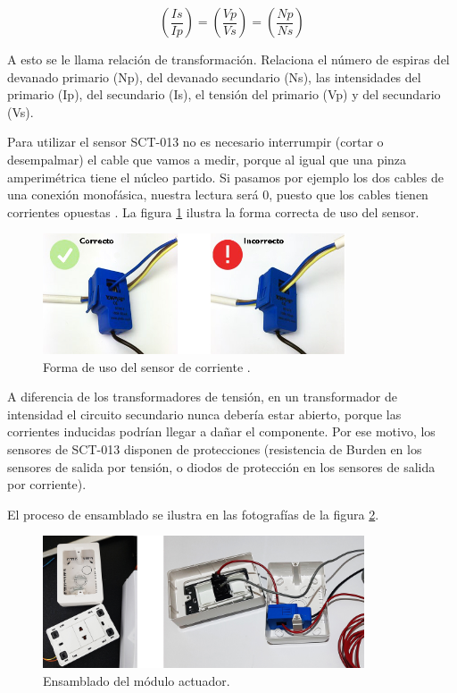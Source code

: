 \begin{enumerate}
\begin{equation}
	\label{eq:proporcionform}
	\left( \frac{Is}{Ip} \right)=\left( \frac{Vp}{Vs} \right)=\left( \frac{Np}{Ns} \right)
\end{equation}

A esto se le llama relación de transformación. Relaciona el número de espiras del devanado primario (Np), del devanado secundario (Ns), las intensidades del primario (Ip), del secundario (Is), el tensión del primario (Vp) y del secundario (Vs). 


Para utilizar el sensor SCT-013 no es necesario interrumpir (cortar o desempalmar) el cable que vamos a medir, porque al igual que una pinza amperimétrica tiene el núcleo partido. Si pasamos por ejemplo los dos cables de una conexión monofásica, nuestra lectura será 0, puesto que los cables tienen corrientes opuestas \citep{WEBSITE:21}. La figura \ref{fig:conectacorrecto} ilustra la forma correcta de uso del sensor.
\vspace{0.5cm}
\begin{figure}[htpb]
\centering 
\includegraphics[width=0.8\textwidth]{./Figures/correcto.jpg}
\caption{Forma de uso del sensor de corriente \protect\footnotemark.}
\label{fig:conectacorrecto}
\end{figure}



A diferencia de los transformadores de tensión, en un transformador de intensidad el circuito secundario nunca debería estar abierto, porque las corrientes inducidas podrían llegar a dañar el componente. Por ese motivo, los sensores de SCT-013 disponen de protecciones (resistencia de Burden en los sensores de salida por tensión, o diodos de protección en los sensores de salida por corriente)\citep{WEBSITE:9}.

El proceso de ensamblado se ilustra en las fotografías de la figura \ref{fig:armadoactuador}.

\begin{figure}[htpb]
\centering 
\includegraphics[width=0.85\textwidth]{./Figures/armadoactuador.jpg}
\caption{Ensamblado del módulo actuador. }
\label{fig:armadoactuador}
\end{figure}


\end{enumerate}
